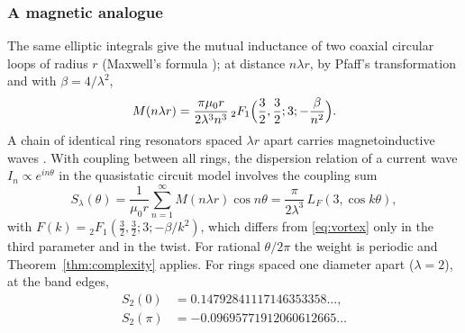 \documentclass[11pt,reqno]{amsart}
\theoremstyle{definition}
\theoremstyle{remark}
\begin{document}
\subsubsection{A magnetic analogue}
The same elliptic integrals give the mutual inductance of two coaxial circular loops of radius $r$ (Maxwell's
formula \cite{RG12}); at distance $n\lambda r$, by Pfaff's transformation and with $\beta = 4/\lambda^2$,
\[
  M(n\lambda r) = \frac{\pi\mu_0r}{2\lambda^3n^3}\,{}_2F_1\Bigl(\frac32,\frac32;3;-\frac{\beta}{n^2}\Bigr).
\]
A chain of identical ring resonators spaced $\lambda r$ apart carries magnetoinductive waves \cite{SKRS02}. With coupling
between all rings, the dispersion relation of a current wave $I_n \propto e^{in\theta}$ in the quasistatic circuit
model involves the coupling sum
\[
  S_\lambda(\theta) = \frac1{\mu_0r}\sum_{n=1}^{\infty}M(n\lambda r)\cos n\theta
  = \frac{\pi}{2\lambda^3}\,L_F(3, \cos k\theta),
\]
with $F(k) = {}_2F_1(\frac32,\frac32;3;-\beta/k^2)$, which differs from \eqref{eq:vortex} only in the third parameter and in the twist. For rational $\theta/2\pi$ the
weight is periodic and Theorem~\ref{thm:complexity} applies. For rings spaced one diameter apart ($\lambda = 2$), at
the band edges,
\begin{align*}
  S_2(0) &= 0.14792841117146353358\ldots, \\
  S_2(\pi) &= -0.09695771912060612665\ldots
\end{align*}
\end{document}
